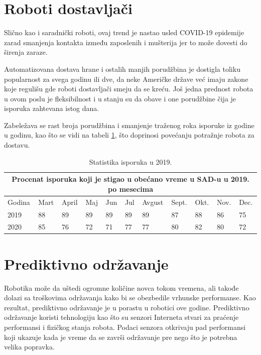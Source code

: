 \documentclass{article}
\begin{document}
	\section{Roboti dostavljači}
	Slično kao i saradnički roboti, ovaj trend je nastao usled COVID-19 epidemije zarad smanjenja kontakta između zaposlenih i mušterija jer to može dovesti do širenja zaraze.
	
	Automatizovana dostava hrane i ostalih manjih porudžbina je dostigla toliku popularnost za svega godinu ili dve, da neke Američke države već imaju zakone koje regulišu gde roboti dostavljači smeju da se kreću. Još jedna prednost robota u ovom poslu je fleksibilnost i u stanju su da obave i one porudžbine čija je isporuka zahtevana istog dana. 
 
 Zabeležava se rast broja porudžbina i smanjenje traženog roka isporuke iz godine u godinu, kao što se vidi na tabeli \ref{table}, što doprinosi povećanju potražnje robota za dostavu. \cite{robotics2022, sameday}  
	\vspace{0.25cm}
	\begin{table}
    \centering
		\begin{tabular}{ |p{1cm}|p{1cm}|p{1cm}|p{1cm} |p{1cm}|p{1cm}|p{1cm}|p{1cm}|p{1cm}|p{1cm}|p{1cm}|}
			\hline
			\multicolumn{11}{|c|}{Procenat isporuka koji je stigao u obećano vreme u SAD-u u 2019. po mesecima} \\
			\hline
			Godina & Mart & April & Maj & Jun & Jul & Avgust & Sept. & Okt. & Nov. & Dec. \\
			\hline
			2019 & 88 & 89 & 89 & 89 & 89 & 89 & 87 & 88 & 86 & 75 \\
			2020 & 85 & 76 & 72 & 71 & 77 & 77 & 80 & 82 & 80 & 72 \\
			\hline
		\end{tabular}
  \caption{Statistika isporuka u 2019.}
      \label{table}
	\end{table}
	
	\section{Prediktivno održavanje}
	Robotika može da uštedi ogromne količine novca tokom vremena, ali takođe dolazi sa troškovima održavanja kako bi se obezbedile vrhunske performanse. Kao rezultat, prediktivno održavanje je u porastu u robotici ove godine. Prediktivno održavanje koristi tehnologiju kao što su senzori Interneta stvari za praćenje performansi i fizičkog stanja robota. Podaci senzora otkrivaju pad performansi koji ukazuje kada je vreme da se završi održavanje pre nego što je potrebna velika popravka.
	
\end{document}
